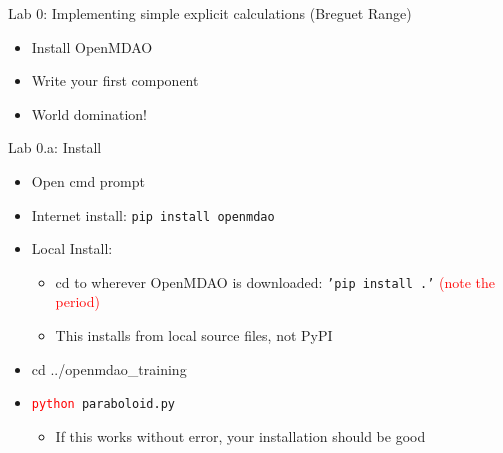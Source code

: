 \documentclass[aspectratio=169, usenames,dvipsnames, 14pt]{beamer}
\begin{document}

\begin{frame}{Lab 0: Implementing simple explicit calculations (Breguet Range)}
    \begin{itemize}
        \item Install OpenMDAO 
        \vspace{0.5cm}
        \item Write your first component 
        \vspace{0.5cm}
        \item World domination!
    \end{itemize}
    
\end{frame}


\begin{frame}{Lab 0.a: Install}
    \begin{itemize}
        \item Open cmd prompt
        \vspace{0.25cm}
        \item Internet install: \texttt{pip install openmdao}
        \vspace{0.25cm}
        \item Local Install:
            \begin{itemize}
                \item cd to wherever OpenMDAO is downloaded: \texttt{'pip install .'} \textcolor{red}{(note the period)}
                \item This installs from local source files, not PyPI
            \end{itemize}
        \vspace{0.25cm}
        \item cd ../openmdao\_training
        \vspace{0.25cm}
        \item \texttt{\textcolor{red}{python} paraboloid.py}
            \begin{itemize}
                \item If this works without error, your installation should be good
            \end{itemize}
    \end{itemize}
\end{frame}
\end{document}
